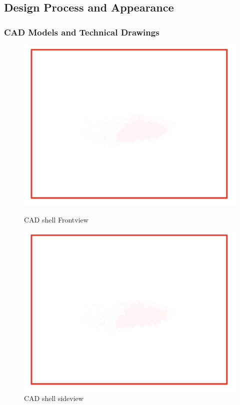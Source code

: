 \subsection{Design Process and Appearance}
\subsubsection{CAD Models and Technical Drawings}

\begin{figure}[!ht]
  \centering
  \begin{minipage}[b]{0.45\linewidth}
    \includegraphics[width=\linewidth]{texfiles/mech/eimg/aerodynamics/shell_frontview}
    \caption{CAD shell Frontview}
    \label{fig:shell_frontview}
  \end{minipage}
  \hspace{0.5cm}
  \begin{minipage}[b]{0.45\linewidth}
    \includegraphics[width=\linewidth]{texfiles/mech/eimg/aerodynamics/shell_side}
    \caption{CAD shell sideview}
    \label{fig:shell_sideview}
  \end{minipage}
\end{figure}

